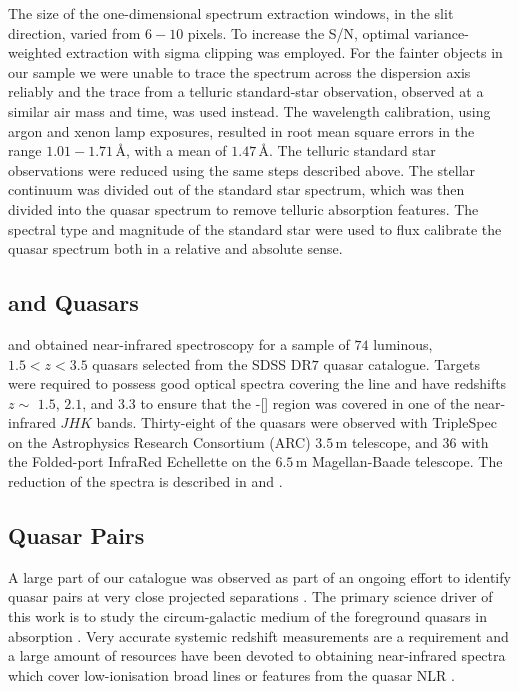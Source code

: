 The size of the one-dimensional spectrum extraction windows, in the slit direction, varied from $6-10$ pixels. 
To increase the S/N, optimal variance-weighted extraction with sigma clipping was employed. 
For the fainter objects in our sample we were unable to trace the spectrum across the dispersion axis reliably and the trace from a telluric standard-star observation, observed at a similar air mass and time, was used instead. 
The wavelength calibration, using argon and xenon lamp exposures, resulted in root mean square errors in the range $1.01-1.71$\,\AA, with a mean of $1.47$\,\AA. 
The telluric standard star observations were reduced using the same steps described above. 
The stellar continuum was divided out of the standard star spectrum, which was then divided into the quasar spectrum to remove telluric absorption features. 
The spectral type and magnitude of the standard star were used to flux calibrate the quasar spectrum both in a relative and absolute sense.

\subsection{\citet{shen12} and \citet{shen16a} Quasars}

\citet{shen16a} and \citet{shen12} obtained near-infrared spectroscopy for a sample of $74$ luminous, $1.5 < z < 3.5$ quasars selected from the SDSS DR$7$ quasar catalogue. 
Targets were required to possess good optical spectra covering the  line and have redshifts $z\sim$ $1.5$, $2.1$, and $3.3$ to ensure that the \hbns-[] region was covered in one of the near-infrared $JHK$ bands.
Thirty-eight of the quasars were observed with TripleSpec \citep{wilson04} on the Astrophysics Research Consortium (ARC) $3.5$\,m telescope, and $36$ with the Folded-port InfraRed Echellette \citep[FIRE;][]{simcoe10} on the $6.5$\,m Magellan-Baade telescope.
The reduction of the spectra is described in \citet{shen16a} and \citet{shen12}. 

\subsection{Quasar Pairs}

A large part of our catalogue was observed as part of an ongoing effort to identify quasar pairs at very close projected separations \citep[Quasars Probing Quasars\footnote{www.ucolick.org/\textasciitilde xavier/QPQ/Quasars\_Probing\_Quasars};][]{hennawi06a,hennawi10}. 
The primary science driver of this work is to study the circum-galactic medium of the foreground quasars in absorption \citep{hennawi06b}.
Very accurate systemic redshift measurements are a requirement and a large amount of resources have been devoted to obtaining near-infrared spectra which cover low-ionisation broad lines or features from the quasar NLR \citep{prochaska09,lau16,hennawi15}. 

